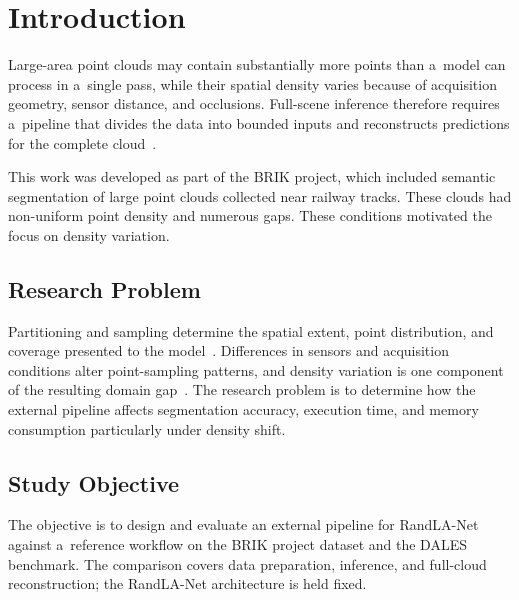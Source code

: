 \section{Introduction}

Large-area point clouds may contain substantially more points than a~model can process in a~single pass, while their spatial density varies because of acquisition geometry, sensor distance, and occlusions. Full-scene inference therefore requires a~pipeline that divides the data into bounded inputs and reconstructs predictions for the complete cloud~\citep{randlanet}.

This work was developed as part of the BRIK project, which included semantic segmentation of large point clouds collected near railway tracks. These clouds had non-uniform point density and numerous gaps. These conditions motivated the focus on density variation.

\subsection{Research Problem}

Partitioning and sampling determine the spatial extent, point distribution, and coverage presented to the model~\citep{randlanet,sensaturban}. Differences in sensors and acquisition conditions alter point-sampling patterns, and density variation is one component of the resulting domain gap~\citep{densityshift,complete-label,lidomaug}. The research problem is to determine how the external pipeline affects segmentation accuracy, execution time, and memory consumption particularly under density shift.

\subsection{Study Objective}

The objective is to design and evaluate an external pipeline for RandLA-Net against a~reference workflow on the BRIK project dataset and the DALES benchmark. The comparison covers data preparation, inference, and full-cloud reconstruction; the RandLA-Net architecture is held fixed.
